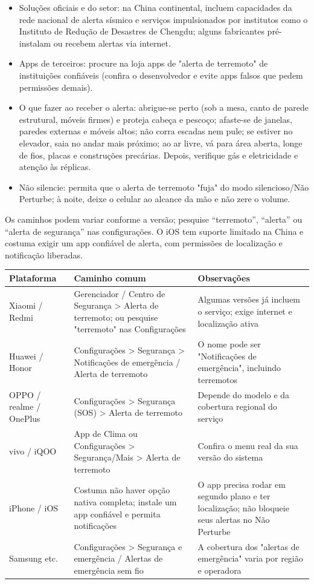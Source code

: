 \begin{itemize}
  \item Soluções oficiais e do setor: na China continental, incluem capacidades da rede nacional de alerta sísmico e serviços impulsionados por institutos como o Instituto de Redução de Desastres de Chengdu; alguns fabricantes pré-instalam ou recebem alertas via internet.
  \item Apps de terceiros: procure na loja apps de "alerta de terremoto" de instituições confiáveis (confira o desenvolvedor e evite apps falsos que pedem permissões demais).
  \item O que fazer ao receber o alerta: abrigue-se perto (sob a mesa, canto de parede estrutural, móveis firmes) e proteja cabeça e pescoço; afaste-se de janelas, paredes externas e móveis altos; não corra escadas nem pule; se estiver no elevador, saia no andar mais próximo; ao ar livre, vá para área aberta, longe de fios, placas e construções precárias. Depois, verifique gás e eletricidade e atenção às réplicas.
  \item Não silencie: permita que o alerta de terremoto "fuja" do modo silencioso/Não Perturbe; à noite, deixe o celular ao alcance da mão e não zere o volume.
\end{itemize}


Os caminhos podem variar conforme a versão; pesquise “terremoto”, “alerta” ou “alerta de segurança” nas configurações. O iOS tem suporte limitado na China e costuma exigir um app confiável de alerta, com permissões de localização e notificação liberadas.

\begin{center}
\begin{tabularx}{\linewidth}{|X|X|X|}
\hline
\textbf{Plataforma} & \textbf{Caminho comum} & \textbf{Observações} \tabularnewline
\hline
Xiaomi / Redmi & Gerenciador / Centro de Segurança > Alerta de terremoto; ou pesquise "terremoto" nas Configurações & Algumas versões já incluem o serviço; exige internet e localização ativa \tabularnewline
Huawei / Honor & Configurações > Segurança > Notificações de emergência / Alerta de terremoto & O nome pode ser "Notificações de emergência", incluindo terremotos \tabularnewline
OPPO / realme / OnePlus & Configurações > Segurança (SOS) > Alerta de terremoto & Depende do modelo e da cobertura regional do serviço \tabularnewline
vivo / iQOO & App de Clima ou Configurações > Segurança/Mais > Alerta de terremoto & Confira o menu real da sua versão do sistema \tabularnewline
iPhone / iOS & Costuma não haver opção nativa completa; instale um app confiável e permita notificações & O app precisa rodar em segundo plano e ter localização; não bloqueie seus alertas no Não Perturbe \tabularnewline
Samsung etc. & Configurações > Segurança e emergência / Alertas de emergência sem fio & A cobertura dos "alertas de emergência" varia por região e operadora \tabularnewline
\hline
\end{tabularx}
\end{center}

